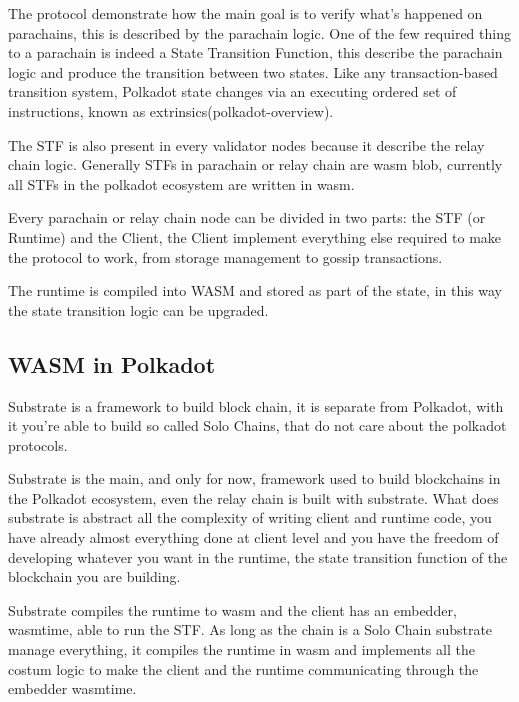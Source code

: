 \documentclass[../main.tex]{subfiles}
\begin{document}
The protocol demonstrate how the main goal is to verify what's happened on parachains, this is described by the parachain logic. One of the few required thing to a parachain is indeed a State Transition Function, this describe the parachain logic and produce the transition between two states. Like any transaction-based transition system, Polkadot state changes via an executing ordered set of instructions, known as extrinsics(polkadot-overview).

The STF is also present in every validator nodes because it describe the relay chain logic. Generally STFs in parachain or relay chain are wasm blob, currently all STFs in the polkadot ecosystem are written in wasm.

Every parachain or relay chain node can be divided in two parts: the STF (or Runtime)  and the Client, the Client implement everything else required to make the protocol to work, from storage management to gossip transactions.

The runtime is compiled into WASM and stored as part of the state, in this way the state transition logic can be upgraded.


\subsection{WASM in Polkadot}

Substrate is a framework to build block chain, it is separate from Polkadot, with it you're able to build so called Solo Chains, that do not care about the polkadot protocols.

Substrate is the main, and only for now, framework used to build blockchains in the Polkadot ecosystem, even the relay chain is built with substrate. What does substrate is abstract all the complexity of writing client and runtime code, you have already almost everything done at client level and you have the freedom of developing whatever you want in the runtime, the state transition function of the blockchain you are building.

Substrate compiles the runtime to wasm and the client has an embedder, wasmtime, able to run the STF. As long as the chain is a Solo Chain substrate manage everything, it compiles the runtime in wasm and implements all the costum logic to make the client and the runtime communicating through the embedder wasmtime.
\end{document}
